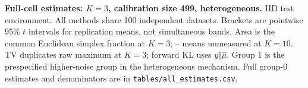 \textbf{Full-cell estimates: $K=3$, calibration size 499, heterogeneous.} IID test environment. All methods share 100 independent datasets. Brackets are pointwise 95\% $t$ intervals for replication means, not simultaneous bands. Area is the common Euclidean simplex fraction at $K=3$; -- means unmeasured at $K=10$. TV duplicates raw maximum at $K=3$; forward KL uses $y\Vert\hat\mu$. Group 1 is the prespecified higher-noise group in the heterogeneous mechanism. Full group-0 estimates and denominators are in \texttt{tables/all\_estimates.csv}.
